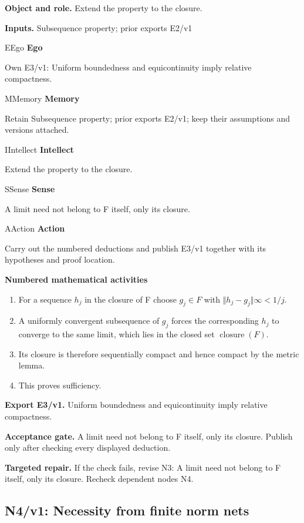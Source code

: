 \documentclass[preprint,12pt,aps,pra,showkeys,amsmath,amssymb,superscriptaddress,floatfix]{revtex4-2}
\theoremstyle{definition}
\theoremstyle{remark}
\newcommand{\mmfaculty}[3]{%
 \begin{mmfacultybox}{#1}{#2}
 {\sffamily\bfseries\color{MMBlue}#2}\par\smallskip #3
 \end{mmfacultybox}}
\newcommand{\field}[2]{\par\smallskip\noindent\textbf{#1.} #2\par}
\begin{document}
\field{Object and role}{Extend the property to the closure.}

\field{Inputs}{Subsequence property; prior exports E2/v1}

\mmfaculty{E}{Ego}{Own E3/v1: Uniform boundedness and equicontinuity imply relative
compactness.}

\mmfaculty{M}{Memory}{Retain Subsequence property; prior exports E2/v1; keep their assumptions
and versions attached.}

\mmfaculty{I}{Intellect}{Extend the property to the closure.}

\mmfaculty{S}{Sense}{A limit need not belong to F itself, only its closure.}

\mmfaculty{A}{Action}{Carry out the numbered deductions and publish E3/v1 together with its
hypotheses and proof location.}

\smallskip\noindent\textbf{Numbered mathematical activities}

\begin{enumerate}[label=N3.\arabic*,leftmargin=3.4em]

\item For a sequence \(h_j\) in the closure of F choose \(g_j\in F\) with
\(\Vert h_j-g_j\Vert \infty <1/j\).

\item A uniformly convergent subsequence of \(g_j\) forces the corresponding
\(h_j\) to converge to the same limit, which lies in the closed set
\(\operatorname{closure} (F)\).

\item Its closure is therefore sequentially compact and hence compact by the
metric lemma.

\item This proves sufficiency.

\end{enumerate}

\field{Export E3/v1}{Uniform boundedness and equicontinuity imply relative compactness.}

\field{Acceptance gate}{A limit need not belong to F itself, only its closure. Publish only
after checking every displayed deduction.}

\field{Targeted repair}{If the check fails, revise N3: A limit need not belong to F itself, only
its closure. Recheck dependent nodes N4.}

\clearpage

\subsection{N4/v1: Necessity from finite norm nets}
\end{document}
